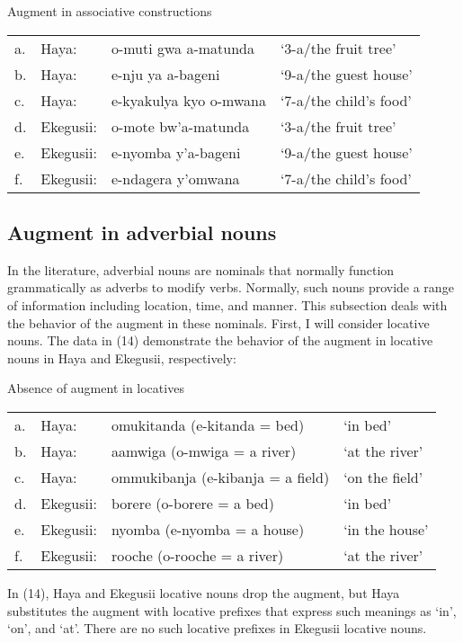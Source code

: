 \documentclass[output=paper]{langscibook}
\begin{document}
\begin{exe}
\ex Augment in associative constructions \\
\label{hayagusii13}
\begin{tabular}{llll}
 a. &	Haya: 	&	o-muti gwa a-matunda &	‘3-a/the fruit tree’ \\
b. &	Haya: 	&	e-nju ya a-bageni	&	‘9-a/the guest house’\\
c. &	Haya: 	&	e-kyakulya kyo o-mwana	& ‘7-a/the child’s food’\\
d. &	Ekegusii: &	o-mote bw’a-matunda	&	‘3-a/the fruit tree’\\
e. &	Ekegusii: &	e-nyomba y’a-bageni	&	‘9-a/the guest house’\\
f. &	Ekegusii: &	e-ndagera y’omwana	&	‘7-a/the child’s food’\\
\end{tabular}


\end{exe}
\subsection{Augment in adverbial nouns}
In the literature, adverbial nouns are nominals that normally function grammatically as adverbs to modify verbs. Normally, such nouns provide a range of information including location, time, and manner. This subsection deals with the behavior of the augment in these nominals. First, I will consider locative nouns. The data in (14) demonstrate the behavior of the augment in locative nouns in Haya and Ekegusii, respectively:

\begin{exe}
\ex Absence of augment in locatives \\
\label{hayagusii14}
\begin{tabular}{llll}
  a. &	Haya: 	&	omukitanda (e-kitanda = bed)	&	‘in bed’\\
b. &	Haya: 	&	aamwiga (o-mwiga = a river)	 &	‘at the river’\\
c. &	Haya: 	&	ommukibanja (e-kibanja = a field) &	‘on the field’\\
d. &	Ekegusii: &	borere (o-borere = a bed)	&	‘in bed’\\
e. &	Ekegusii: &	nyomba (e-nyomba = a house)	& ‘in the house’\\
f. &	Ekegusii: &	rooche (o-rooche = a river) &		‘at the river’\\
\end{tabular}
\end{exe}
In (14), Haya and Ekegusii locative nouns drop the augment, but Haya substitutes the augment with locative prefixes that express such meanings as ‘in’, ‘on’, and ‘at’. There are no such locative prefixes in Ekegusii locative nouns. 
\end{document}
